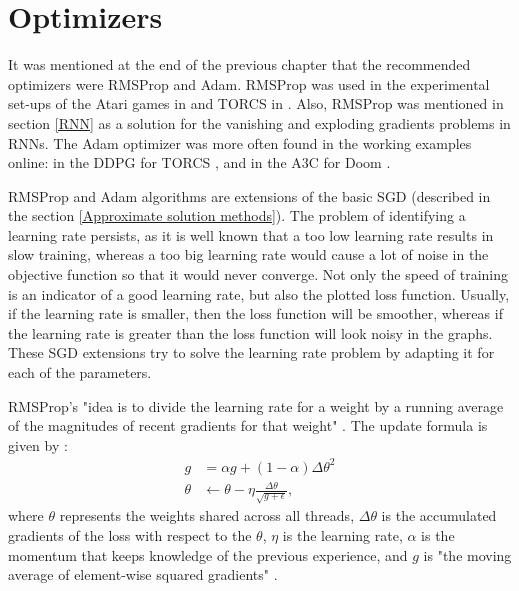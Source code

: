 \section{Optimizers}\label{Optimizers}
It was mentioned at the end of the previous chapter that the recommended optimizers were RMSProp and Adam. RMSProp was used in the experimental set-ups of the Atari games in \cite{DBLP:journals/corr/MnihKSGAWR13} and TORCS in \cite{DBLP:journals/corr/MnihBMGLHSK16}. Also, RMSProp was mentioned in section \ref{RNN} as a solution for the vanishing and exploding gradients problems in RNNs. The Adam optimizer was more often found in the working examples online: in the DDPG for TORCS \cite{DDPG_Torcs}, and in the A3C for Doom \cite{A3CDoom}.

RMSProp and Adam algorithms are extensions of the basic SGD (described in the section \ref{Approximate solution methods}). The problem of identifying a learning rate persists, as it is well known that a too low learning rate results in slow training, whereas a too big learning rate would cause a lot of noise in the objective function so that it would never converge. Not only the speed of training is an indicator of a good learning rate, but also the plotted loss function. Usually, if the learning rate is smaller, then the loss function will be smoother, whereas if the learning rate is greater than the loss function will look noisy in the graphs. These SGD extensions try to solve the learning rate problem by adapting it for each of the parameters.

RMSProp's "idea is to divide the learning rate for a weight by a running average of the magnitudes of recent gradients for that weight" \cite{RMSProp}. The update formula is given by \cite{DBLP:journals/corr/MnihBMGLHSK16}:
\begin{equation}\label{RMSPropUpdate}
\begin{aligned}
g&=\alpha g + (1-\alpha)\Delta \theta^2\\
\theta & \leftarrow \theta - \eta  \frac{\Delta \theta}{\sqrt{g+\epsilon}},
\end{aligned}
\end{equation}
where $\theta$ represents the weights shared across all threads, $\Delta \theta$ is the accumulated gradients of the loss with respect to the $\theta$, $\eta$ is the learning rate, $\alpha$ is the momentum that keeps knowledge of the previous experience, and $g$ is "the moving average of element-wise squared gradients" \cite{DBLP:journals/corr/MnihBMGLHSK16}.

